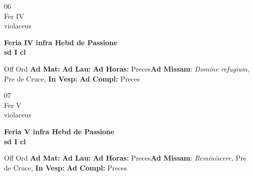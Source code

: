 \documentclass[10pt, openany]{book}
\begin{document}
        \begin{center}
            \begin{minipage}{3.5in}
                \vspace{2em}
                \begin{minipage}{0.5in}
                    {\Huge 06} \\
                    {\normalsize Fer IV} \\
                    {\normalsize violaceus}
                \end{minipage}
                \begin{minipage}{3.0in}
                    \textbf{ \large Feria IV infra Hebd de Passione \\
                    \textnormal{\normalsize sd I cl}} \\ 
                \end{minipage}
                \begin{justify}Off Ord
                    \textbf{Ad Mat: }
                    \textbf{Ad Lau: }
                    \textbf{Ad Horas: }Preces\textbf{Ad Missam}: \textit{Domine refugium,} Pre de Cruce,  
                    \textbf{In Vesp: }
                    \textbf{Ad Compl: }Preces
                \end{justify}
            \end{minipage}
        \end{center}
    
        \begin{center}
            \begin{minipage}{3.5in}
                \vspace{2em}
                \begin{minipage}{0.5in}
                    {\Huge 07} \\
                    {\normalsize Fer V} \\
                    {\normalsize violaceus}
                \end{minipage}
                \begin{minipage}{3.0in}
                    \textbf{ \large Feria V infra Hebd de Passione \\
                    \textnormal{\normalsize sd I cl}} \\ 
                \end{minipage}
                \begin{justify}Off Ord
                    \textbf{Ad Mat: }
                    \textbf{Ad Lau: }
                    \textbf{Ad Horas: }Preces\textbf{Ad Missam}: \textit{Reminíscere,} Pre de Cruce,  
                    \textbf{In Vesp: }
                    \textbf{Ad Compl: }Preces
                \end{justify}
            \end{minipage}
        \end{center}
    
\end{document}
